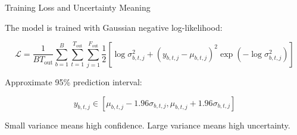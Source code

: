 \begin{frame}[allowframebreaks]{Training Loss and Uncertainty Meaning}
    \small
    
    The model is trained with Gaussian negative log-likelihood:
    
    \[
        \mathcal{L}
        =
        \frac{1}{BT_{\mathrm{out}}}
        \sum_{b=1}^{B}
        \sum_{t=1}^{T_{\mathrm{out}}}
        \sum_{j=1}^{F_{\mathrm{out}}}
        \frac{1}{2}
        \left[
            \log \sigma^2_{b,t,j}
            +
            (y_{b,t,j}-\mu_{b,t,j})^2
            \exp
            (
            -\log \sigma^2_{b,t,j}
            )
        \right]
    \]
    
    \vspace{0.3cm}
    
    Approximate 95\% prediction interval:
    
    \[
        y_{b,t,j}
        \in
        [
            \mu_{b,t,j}
            -
            1.96\sigma_{b,t,j},
            \mu_{b,t,j}
            +
            1.96\sigma_{b,t,j}
        ]
    \]
    
    \vspace{0.2cm}
    
    Small variance means high confidence. Large variance means high uncertainty.
\end{frame}